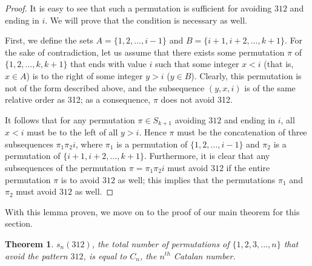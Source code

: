 \documentclass[11pt,letterpaper,twoside,english]{article}
\theoremstyle{theorem}
\newtheorem{theorem}{Theorem}
\theoremstyle{remark}
\begin{document}
\begin{proof}

It is easy to see that such a permutation is sufficient for avoiding $312$ and ending in $i$. We will prove that the condition is necessary as well.

First, we define the sets $A=\{1,2,\ldots,i-1\}$ and $B=\{i+1,i+2,\ldots,k+1\}$. For the sake of contradiction, let us assume that there exists some permutation $\pi$ of $\{1,2,...,k,k+1\}$ that ends with value $i$ such that some integer $x < i$ (that is, $x \in A$) is to the right of some integer $y > i$ ($y \in B$). Clearly, this permutation is not of the form described above, and the subsequence $(y, x, i)$ is of the same relative order as 312; as a consequence, $\pi$ does not avoid 312.

It follows that for any permutation $\pi\in S_{k+1}$ avoiding $312$ and ending in $i$, all $x < i$ must be to the left of all $y > i$. Hence $\pi$ must be the concatenation of three subsequences $\pi_1 \pi_2 i$, where $\pi_1$ is a permutation of $\{1, 2, \ldots, i-1\}$ and $\pi_2$ is a permutation of $\{i+1, i+2, \ldots, k+1\}$. Furthermore, it is clear that any subsequences of the permutation $\pi = \pi_1 \pi_2 i$ must avoid $312$ if the entire permutation $\pi$ is to avoid $312$ as well; this implies that the permutations $\pi_1$ and $\pi_2$ must avoid $312$ as well.
\end{proof}

With this lemma proven, we move on to the proof of our main theorem for this section.

\begin{theorem}
$s_n(312)$, the total number of permutations of $\{1,2,3,...,n\}$ that avoid the pattern $312$, is equal to $C_n$, the $n^{th}$ Catalan number.
\end{theorem}
\end{document}
